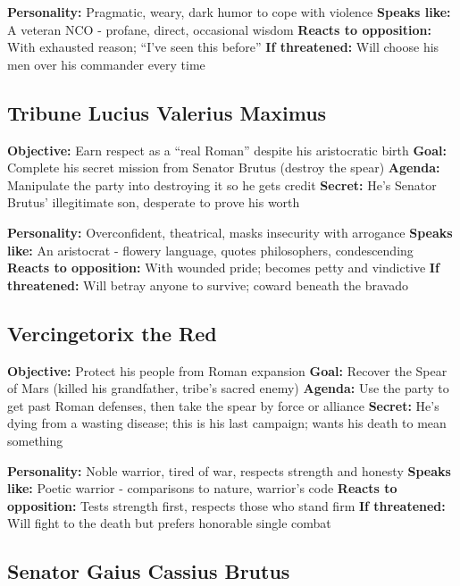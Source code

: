 \documentclass[
]{book}
\begin{document}
\textbf{Personality:} Pragmatic, weary, dark humor to cope with violence
\textbf{Speaks like:} A veteran NCO - profane, direct, occasional wisdom
\textbf{Reacts to opposition:} With exhausted reason; ``I've seen this
before'' \textbf{If threatened:} Will choose his men over his commander
every time

\subsection{Tribune Lucius Valerius
Maximus}\label{tribune-lucius-valerius-maximus}

\textbf{Objective:} Earn respect as a ``real Roman'' despite his
aristocratic birth \textbf{Goal:} Complete his secret mission from
Senator Brutus (destroy the spear) \textbf{Agenda:} Manipulate the party
into destroying it so he gets credit \textbf{Secret:} He's Senator
Brutus' illegitimate son, desperate to prove his worth

\textbf{Personality:} Overconfident, theatrical, masks insecurity with
arrogance \textbf{Speaks like:} An aristocrat - flowery language, quotes
philosophers, condescending \textbf{Reacts to opposition:} With wounded
pride; becomes petty and vindictive \textbf{If threatened:} Will betray
anyone to survive; coward beneath the bravado

\subsection{Vercingetorix the Red}\label{vercingetorix-the-red}

\textbf{Objective:} Protect his people from Roman expansion
\textbf{Goal:} Recover the Spear of Mars (killed his grandfather,
tribe's sacred enemy) \textbf{Agenda:} Use the party to get past Roman
defenses, then take the spear by force or alliance \textbf{Secret:} He's
dying from a wasting disease; this is his last campaign; wants his death
to mean something

\textbf{Personality:} Noble warrior, tired of war, respects strength and
honesty \textbf{Speaks like:} Poetic warrior - comparisons to nature,
warrior's code \textbf{Reacts to opposition:} Tests strength first,
respects those who stand firm \textbf{If threatened:} Will fight to the
death but prefers honorable single combat

\subsection{Senator Gaius Cassius
Brutus}\label{senator-gaius-cassius-brutus}
\end{document}
